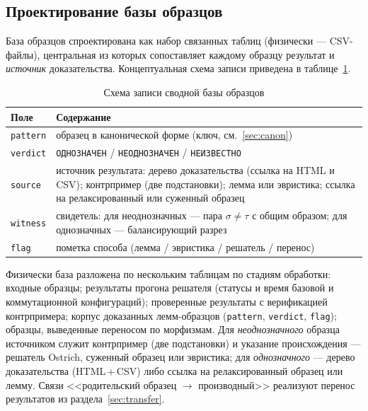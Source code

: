 \documentclass[14pt, russian]{scrartcl}
\begin{document}
\subsection{Проектирование базы образцов}
\label{sec:db}

База образцов спроектирована как набор связанных таблиц (физически --- CSV-файлы),
центральная из которых сопоставляет каждому образцу результат и \textit{источник}
доказательства. Концептуальная схема записи приведена в таблице~\ref{tab:db}.

\begin{table}[h!]
\caption{Схема записи сводной базы образцов}
\label{tab:db}
\begin{tabularx}{\textwidth}{|l|X|}
\hline
Поле & Содержание \\
\hline
\texttt{pattern}  & образец в канонической форме (ключ, см.~\ref{sec:canon}) \\
\hline
\texttt{verdict}  & \texttt{ОДНОЗНАЧЕН} / \texttt{НЕОДНОЗНАЧЕН} / \texttt{НЕИЗВЕСТНО} \\
\hline
\texttt{source}   & источник результата: дерево доказательства (ссылка на HTML и CSV);
                    контрпример (две подстановки); лемма или эвристика; ссылка на
                    релаксированный или суженный образец \\
\hline
\texttt{witness}  & свидетель: для неоднозначных --- пара $\sigma\neq\tau$ с общим
                    образом; для однозначных --- балансирующий разрез \\
\hline
\texttt{flag}     & пометка способа (лемма / эвристика / решатель / перенос) \\
\hline
\end{tabularx}
\end{table}

Физически база разложена по нескольким таблицам по стадиям обработки: входные образцы;
результаты прогона решателя (статусы и время базовой и коммутационной конфигураций);
проверенные результаты с верификацией контрпримера; корпус доказанных лемм-образцов
(\texttt{pattern}, \texttt{verdict}, \texttt{flag}); образцы, выведенные переносом по
морфизмам. Для \textit{неоднозначного} образца источником служит контрпример (две
подстановки) и указание происхождения --- решатель Ostrich, суженный образец или
эвристика; для \textit{однозначного} --- дерево доказательства (HTML\,+\,CSV) либо
ссылка на релаксированный образец или лемму. Связи <<родительский образец $\to$
производный>> реализуют перенос результатов из раздела~\ref{sec:transfer}.
\end{document}
